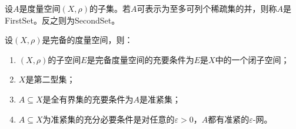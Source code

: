\begin{definition}
	设$A$是度量空间$(X,\rho)$的子集。若$A$可表示为至多可列个稀疏集的并，则称$A$是\gls{FirstSet}。反之则为\gls{SecondSet}。
\end{definition}
\begin{property}\label{prop:CompleteMetricSpace}
	设$(X,\rho)$是完备的度量空间，则：
	\begin{enumerate}
		\item $(X,\rho)$的子空间$E$是完备度量空间的充要条件为$E$是$X$中的一个闭子空间；
		\item $X$是第二型集；
		\item $A\subseteq X$是全有界集的充要条件为$A$是准紧集；
		\item $A\subseteq X$为准紧集的充分必要条件是对任意的$\varepsilon>0$，$A$都有准紧的$\varepsilon$-网。
	\end{enumerate}
\end{property}
